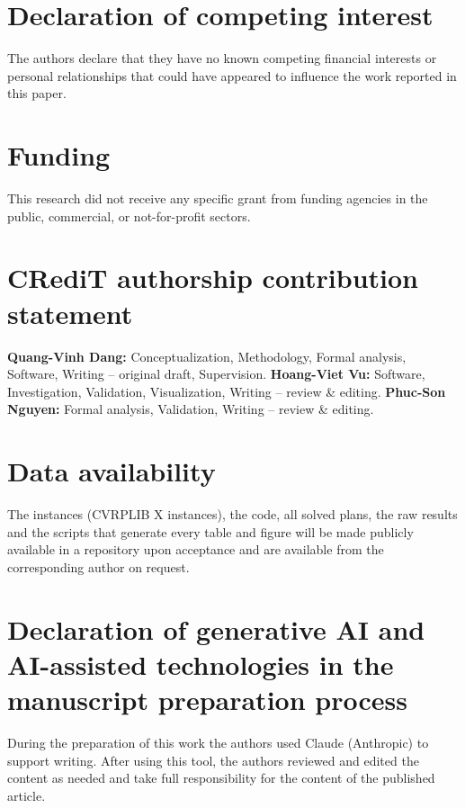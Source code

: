 \documentclass[11pt]{article}
\theoremstyle{definition}
\begin{document}
\section*{Declaration of competing interest}
The authors declare that they have no known competing financial interests or
personal relationships that could have appeared to influence the work reported
in this paper.

\section*{Funding}
This research did not receive any specific grant from funding agencies in the
public, commercial, or not-for-profit sectors.

\section*{CRediT authorship contribution statement}
\textbf{Quang-Vinh Dang:} Conceptualization, Methodology, Formal analysis,
Software, Writing -- original draft, Supervision.
\textbf{Hoang-Viet Vu:} Software, Investigation, Validation, Visualization,
Writing -- review \& editing.
\textbf{Phuc-Son Nguyen:} Formal analysis, Validation, Writing -- review \&
editing.

\section*{Data availability}
The instances (CVRPLIB X instances), the code, all solved plans, the raw
results and the scripts that generate every table and figure will be made
publicly available in a repository upon acceptance and are available from the
corresponding author on request.

\section*{Declaration of generative AI and AI-assisted technologies in the manuscript preparation process}
During the preparation of this work the authors used Claude (Anthropic) to
support writing. After using this tool, the authors reviewed and edited the
content as needed and take full responsibility for the content of the
published article.



\end{document}
